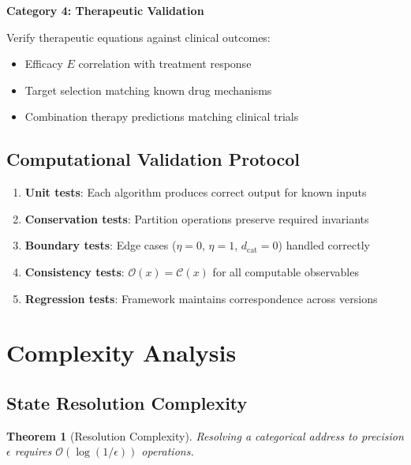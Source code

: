 \documentclass[10pt,twocolumn]{article}
\theoremstyle{plain}
\newtheorem{theorem}{Theorem}[section]
\theoremstyle{definition}
\theoremstyle{remark}
\newcommand{\dcat}{d_{\mathrm{cat}}}
\newcommand{\Obs}{\mathcal{O}}
\newcommand{\Comp}{\mathcal{C}}
\newcommand{\bigO}{\mathcal{O}}
\begin{document}
\textbf{Category 4: Therapeutic Validation}

Verify therapeutic equations against clinical outcomes:
\begin{itemize}
\item Efficacy $E$ correlation with treatment response
\item Target selection matching known drug mechanisms
\item Combination therapy predictions matching clinical trials
\end{itemize}

\subsection{Computational Validation Protocol}

\begin{enumerate}[label=\arabic*.]
\item \textbf{Unit tests}: Each algorithm produces correct output for known inputs
\item \textbf{Conservation tests}: Partition operations preserve required invariants
\item \textbf{Boundary tests}: Edge cases ($\eta = 0$, $\eta = 1$, $\dcat = 0$) handled correctly
\item \textbf{Consistency tests}: $\Obs(x) = \Comp(x)$ for all computable observables
\item \textbf{Regression tests}: Framework maintains correspondence across versions
\end{enumerate}

\section{Complexity Analysis}
\label{sec:complexity}

\subsection{State Resolution Complexity}

\begin{theorem}[Resolution Complexity]
\label{thm:resolution_complexity}
Resolving a categorical address to precision $\epsilon$ requires $\bigO(\log(1/\epsilon))$ operations.
\end{theorem}
\end{document}
